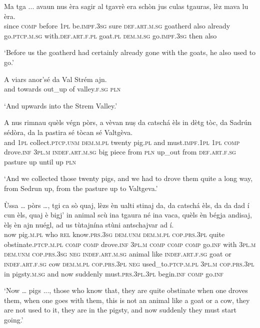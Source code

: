 \begin{linenumbers}
	\gll  Ma tga ... avaun nus èra sagir al tgavrè era schòn jus culas tgauras, lèz mava lu èra.\\
	since \textsc{comp} {} before \textsc{1pl} be.\textsc{impf.3sg} sure \textsc{def.art.m.sg} goatherd also already go.\textsc{ptcp.m.sg} with.\textsc{def.art.f.pl} goat.\textsc{pl} \textsc{dem.m.sg} go.\textsc{impf.3sg} then also\\
\end{linenumbers}
\medskip
\glt `Before us the goatherd had certainly already gone with the goats, he also used to go.'
\medskip

\begin{linenumbers}
	\gll    A viars anor’sé da Val Strém ajn.\\
	and towards out\_up of valley.\textsc{f.sg} \textsc{pln}\\
\end{linenumbers}
\medskip
\glt `And upwards into the Strem Valley.'
\medskip

\begin{linenumbers}
	\gll    A nus rimnau quèls végn pòrs, a vèvan nuṣ da catschá èls in dètg tòc, da Sadrún sédòra, da la pastira sé tòcan sé Valtgèva.\\
	and \textsc{1pl} collect.\textsc{ptcp.unm}  \textsc{dem.m.pl} twenty pig.\textsc{pl} and must.\textsc{impf.1pl} \textsc{1pl} \textsc{comp} drove.\textsc{inf} \textsc{3pl.m} \textsc{indef.art.m.sg} big piece from \textsc{pln} up\_out from \textsc{def.art.f.sg}  pasture up until up \textsc{pln}\\
\end{linenumbers}
\medskip
\glt `And we collected those twenty pigs, and we had to drove them quite a long way, from Sedrun up, from the pasture up to Valtgeva.'
\medskip

\begin{linenumbers}
	\gll    Ùssa … pòrs …, tgi ca sò quaj, lèzs èn ualti stinaj da, da catschá èls, da da dad í cun èls, quaj è bigj’ in animal scù ina tgaura né ina vaca, quèls èn bégja andisaj, èlṣ èn ajn nuégl, ad us tùtajnína stùni antschajvar ad í.\\
	now {} pig.\textsc{m.pl} {} who \textsc{rel}  know.\textsc{prs.3sg} \textsc{dem.unm} \textsc{dem.m.pl} \textsc{cop.prs.3pl} quite obstinate.\textsc{ptcp.m.pl} \textsc{comp} \textsc{comp} drove.\textsc{inf} \textsc{3pl.m} \textsc{comp} \textsc{comp} \textsc{comp} go.\textsc{inf} with \textsc{3pl.m} \textsc{dem.unm} \textsc{cop.prs.3sg} \textsc{neg} \textsc{indef.art.m.sg} animal like \textsc{indef.art.f.sg} goat or \textsc{indef.art.f.sg} cow  \textsc{dem.m.pl} \textsc{cop.prs.3pl} \textsc{neg} used\_to.\textsc{ptcp.m.pl} \textsc{3pl.m} \textsc{cop.prs.3pl} in pigsty.\textsc{m.sg} and now suddenly must.\textsc{prs.3pl.3pl} begin.\textsc{inf} \textsc{comp} go.\textsc{inf}\\
\end{linenumbers}
\medskip
\glt `Now … pigs ..., those who know that, they are quite obstinate when one droves them, when one goes with them, this is not an animal like a goat or a cow, they are not used to it, they are in the pigsty, and now suddenly they must start going.'
\medskip

